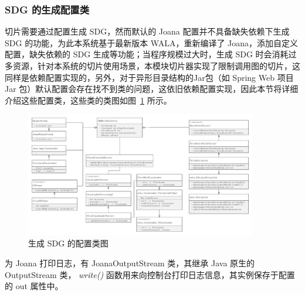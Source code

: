 \begin{minipage}[!htbp]{0.9\textwidth}
    
\end{minipage}


\subsubsection{SDG 的生成配置类}
切片需要通过配置生成 SDG，然而默认的 Joana 配置并不具备缺失依赖下生成 SDG 的功能，为此本系统基于最新版本 WALA，重新编译了 Joana，添加自定义配置，缺失依赖的 SDG 生成等功能；当程序规模过大时，生成 SDG 时会消耗过多资源，针对本系统的切片使用场景，本模块切片器实现了限制调用图的切片，这同样是依赖配置实现的，另外，对于异形目录结构的Jar包（如 Spring Web 项目 Jar 包）默认配置会存在找不到类的问题，这依旧依赖配置实现，因此本节将详细介绍这些配置类，这些类的类图如图~\ref{JoanaConfig} 所示。

\begin{figure}[!htb]
    \centering
    \includegraphics[width=0.9\textwidth]{FIGs/chapter4/sliceConfigClass.pdf}
    \caption{生成 SDG 的配置类图}\label{JoanaConfig}
\end{figure}

为 Joana 打印日志，有 JoanaOutputStream 类，其继承 Java 原生的 OutputStream 类， \textit{write()} 函数用来向控制台打印日志信息，其实例保存于配置的 out 属性中。

